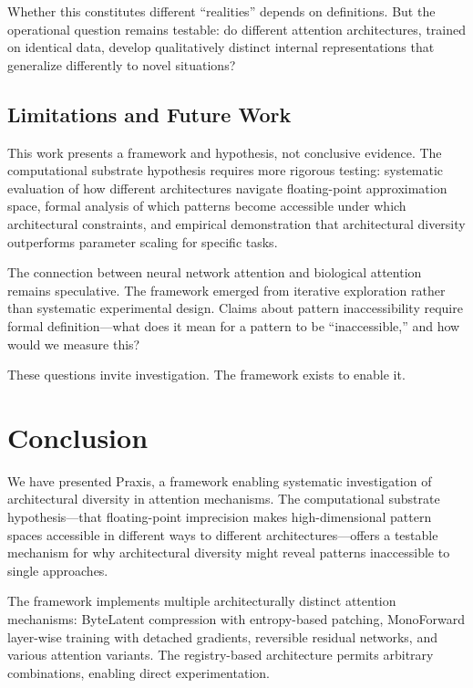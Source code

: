 \documentclass{article}
\begin{document}
Whether this constitutes different ``realities'' depends on definitions. But the operational question remains testable: do different attention architectures, trained on identical data, develop qualitatively distinct internal representations that generalize differently to novel situations?

\subsection{Limitations and Future Work}

This work presents a framework and hypothesis, not conclusive evidence. The computational substrate hypothesis requires more rigorous testing: systematic evaluation of how different architectures navigate floating-point approximation space, formal analysis of which patterns become accessible under which architectural constraints, and empirical demonstration that architectural diversity outperforms parameter scaling for specific tasks.

The connection between neural network attention and biological attention remains speculative. The framework emerged from iterative exploration rather than systematic experimental design. Claims about pattern inaccessibility require formal definition—what does it mean for a pattern to be ``inaccessible,'' and how would we measure this?

These questions invite investigation. The framework exists to enable it.

\section{Conclusion}

We have presented Praxis, a framework enabling systematic investigation of architectural diversity in attention mechanisms. The computational substrate hypothesis—that floating-point imprecision makes high-dimensional pattern spaces accessible in different ways to different architectures—offers a testable mechanism for why architectural diversity might reveal patterns inaccessible to single approaches.

The framework implements multiple architecturally distinct attention mechanisms: ByteLatent compression with entropy-based patching, MonoForward layer-wise training with detached gradients, reversible residual networks, and various attention variants. The registry-based architecture permits arbitrary combinations, enabling direct experimentation.
\end{document}

